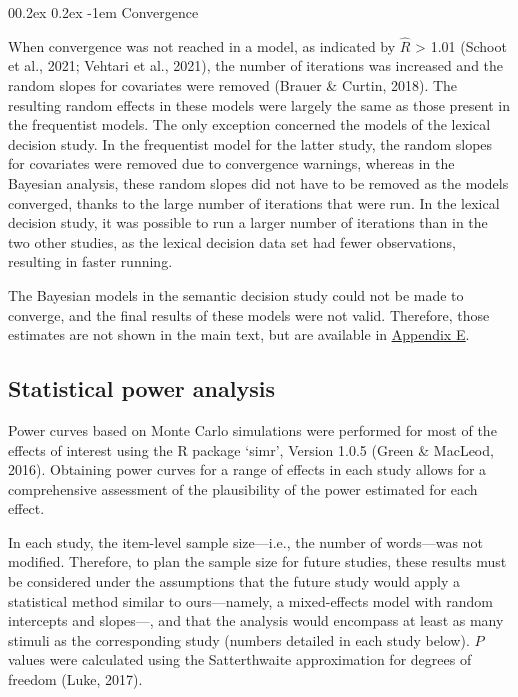 \documentclass[
  12pt,
  man,floatsintext]{apa7}
\makeatletter
\let\oldparagraph\paragraph
\renewcommand{\paragraph}[1]{\oldparagraph{#1}\mbox{}}
\renewcommand{\paragraph}{\@startsection{paragraph}{4}{\parindent}%
  {0\baselineskip \@plus 0.2ex \@minus 0.2ex}%
  {-1em}%
  {\normalfont\normalsize\bfseries\itshape\typesectitle}}
\makeatother
\begin{document}
\hypertarget{convergence}{%
\paragraph{Convergence}\label{convergence}}

When convergence was not reached in a model, as indicated by \(\widehat R\) \textgreater{} 1.01 (Schoot et al., 2021; Vehtari et al., 2021), the number of iterations was increased and the random slopes for covariates were removed (Brauer \& Curtin, 2018). The resulting random effects in these models were largely the same as those present in the frequentist models. The only exception concerned the models of the lexical decision study. In the frequentist model for the latter study, the random slopes for covariates were removed due to convergence warnings, whereas in the Bayesian analysis, these random slopes did not have to be removed as the models converged, thanks to the large number of iterations that were run. In the lexical decision study, it was possible to run a larger number of iterations than in the two other studies, as the lexical decision data set had fewer observations, resulting in faster running.

The Bayesian models in the semantic decision study could not be made to converge, and the final results of these models were not valid. Therefore, those estimates are not shown in the main text, but are available in \protect\hyperlink{appendix-E-Bayesian-analysis-results}{\underline{Appendix E}}.

\hypertarget{statistical-power-analysis-1}{%
\subsection{Statistical power analysis}\label{statistical-power-analysis-1}}

Power curves based on Monte Carlo simulations were performed for most of the effects of interest using the R package `simr', Version 1.0.5 (Green \& MacLeod, 2016). Obtaining power curves for a range of effects in each study allows for a comprehensive assessment of the plausibility of the power estimated for each effect.

In each study, the item-level sample size---i.e., the number of words---was not modified. Therefore, to plan the sample size for future studies, these results must be considered under the assumptions that the future study would apply a statistical method similar to ours---namely, a mixed-effects model with random intercepts and slopes---, and that the analysis would encompass at least as many stimuli as the corresponding study (numbers detailed in each study below). \(P\) values were calculated using the Satterthwaite approximation for degrees of freedom (Luke, 2017).
\end{document}
